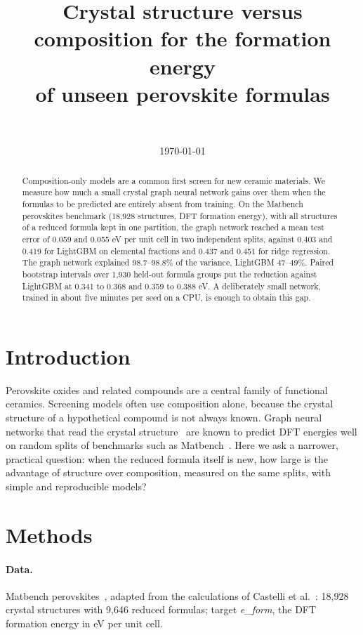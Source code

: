 \documentclass[11pt]{article}
\title{Crystal structure versus composition for the formation energy\\ of unseen perovskite formulas}
\author{\authorname\\ \small \affiliation}
\date{\today}
\begin{document}
\maketitle

\begin{abstract}
Composition-only models are a common first screen for new ceramic materials. We measure how much a small crystal
graph neural network gains over them when the formulas to be predicted are entirely absent from training. On the
Matbench perovskites benchmark (18,928 structures, DFT formation energy), with all structures of a reduced formula kept
in one partition, the graph network reached a mean test error of 0.059 and 0.055 eV per unit cell in two
independent splits, against 0.403 and 0.419 for LightGBM on elemental fractions and 0.437 and 0.451 for ridge
regression. The graph network explained 98.7--98.8\% of the variance, LightGBM 47--49\%. Paired bootstrap intervals
over 1,930 held-out formula groups put the reduction against LightGBM at 0.341 to 0.368 and 0.359 to 0.388 eV.
A deliberately small network, trained in about five minutes per seed on a CPU, is enough to obtain this gap.
\end{abstract}

\section{Introduction}
Perovskite oxides and related compounds are a central family of functional ceramics. Screening models often use
composition alone, because the crystal structure of a hypothetical compound is not always known. Graph neural
networks that read the crystal structure~\cite{cgcnn} are known to predict DFT energies well on random splits of
benchmarks such as Matbench~\cite{matbench}. Here we ask a narrower, practical question: when the reduced formula itself
is new, how large is the advantage of structure over composition, measured on the same splits, with simple and
reproducible models?

\section{Methods}
\paragraph{Data.} Matbench perovskites~\cite{matbench}, adapted from the calculations of Castelli et
al.~\cite{castelli}: 18,928 crystal structures with 9,646 reduced formulas; target
\emph{e\_form}, the DFT formation energy in eV per unit cell.
\end{document}
